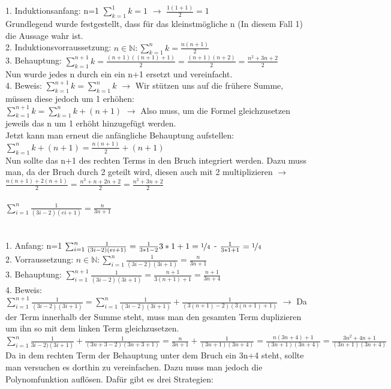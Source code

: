 \documentclass{article}
\newcommand{\paragraphlb}[1]{\paragraph{#1}\mbox{}\\}
\newcommand{\N}{\mathbb{N}}
\begin{document}
	1. Induktionsanfang: n=1 $\sum^{1}_{k=1}{k} = 1$ $\to$ $\frac{1(1+1)}{2} = 1$ \\
	Grundlegend wurde festgestellt, dass für das kleinstmögliche n (In diesem Fall 1) die Aussage wahr ist. \\
	2. Induktionsvorraussetzung: $n\in \N:\sum^{n}_{k=1}{k}=\frac{n(n+1)}{2}$ \\
	3. Behauptung: $\sum^{n+1}_{k=1}{k}=\frac{(n+1)((n+1)+1)}{2}=\frac{(n+1)(n+2)}{2}=\frac{n^2+3n+2}{2}$ \\
	Nun wurde jedes n durch ein ein n+1 ersetzt und vereinfacht. \\
	4. Beweis: $\sum^{n+1}_{k=1}{k}=\sum^{n}_{k=1}{k}$ $\to$ Wir stützen uns auf die frühere Summe, müssen diese jedoch um 1 erhöhen: \\
	$\sum^{n+1}_{k=1}{k}=\sum^{n}_{k=1}{k+(n+1)}$ $\to$ Also muss, um die Formel gleichzusetzen jeweils das n um 1 erhöht hinzugefügt werden. \\
	Jetzt kann man erneut die anfängliche Behauptung aufstellen: $\sum^{n}_{k=1}{k+(n+1)} = \frac{n(n+1)}{2}+(n+1)$ \\
	Nun sollte das n+1 des rechten Terms in den Bruch integriert werden. Dazu muss man, da der Bruch durch 2 geteilt wird, diesen auch mit 2 multiplizieren $\to$ $\frac{n(n+1)+2(n+1)}{2}=\frac{n^2+n+2n+2}{2}=\frac{n^2+3n+2}{2}$
	\paragraphlb{$\sum^{n}_{i=1}{\frac{1}{(3i-2)(ei+1)}}=\frac{n}{3n+1}$}
	1. Anfang: n=1 $\sum^{n}_{i=1}{\frac{1}{(3i-2)(ei+1)}}=\frac{1}{3*1-2}{3*1+1}=\nicefrac{1}{4}$ - $\frac{1}{3*1+1}=\nicefrac{1}{4}$ \\
	2. Vorraussetzung: $n\in\N:\sum^{n}_{i=1}{\frac{1}{(3i-2)(3i+1)}}=\frac{n}{3n+1}$ \\
	3. Behauptung: $\sum^{n+1}_{i=1}{\frac{1}{(3i-2)(3i+1)}}=\frac{n+1}{3(n+1)+1}=\frac{n+1}{3n+4}$ \\
	4. Beweis: $\sum^{n+1}_{i=1}{\frac{1}{(3i-2)(3i+1)}}=\sum^{n}_{i=1}{\frac{1}{(3i-2)(3i+1)}}+\frac{1}{(3(n+1)-2)(3(n+1)+1)}$ $\to$ Da der Term innerhalb der Summe steht, muss man den gesamten Term duplizieren um ihn so mit dem linken Term gleichzusetzen. \\
	$\sum^{n}_{i=1}{\frac{1}{3i-2)(3i+1)}}+\frac{1}{(3n+3-2)(3n+3+1)} = \frac{n}{3n+1}+\frac{1}{(3n+1)(3n+4)} = \frac{n(3n+4)+1}{(3n+1)(3n+4)}=\frac{3n^2+4n+1}{(3n+1)(3n+4)}$\\
	Da in dem rechten Term der Behauptung unter dem Bruch ein 3n+4 steht, sollte man versuchen es dorthin zu vereinfachen. Dazu muss man jedoch die Polynomfunktion auflösen. Dafür gibt es drei Strategien:
\end{document}
